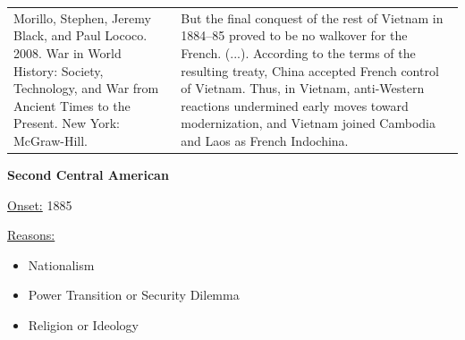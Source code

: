 {\begin{longtable}{p{}p{}}
\\
Morillo, Stephen, Jeremy Black, and Paul Lococo. 2008. War in World History: Society, Technology, and War from Ancient Times to the Present. New York: McGraw-Hill. & But the final conquest of the rest of Vietnam in 1884–85 proved to be no walkover for the French. (...).  According to the terms of the resulting treaty, China accepted French control of Vietnam. Thus, in Vietnam, anti-Western reactions undermined early moves toward modernization, and Vietnam joined Cambodia and Laos as French Indochina.
\\
\end{longtable}}
\clearpage
         \textbf{Second Central American} 

          \underline{Onset:} 1885         

\underline{Reasons:}
\begin{itemize}
\item Nationalism
\item Power Transition or Security Dilemma
\item Religion or Ideology
\end{itemize}

